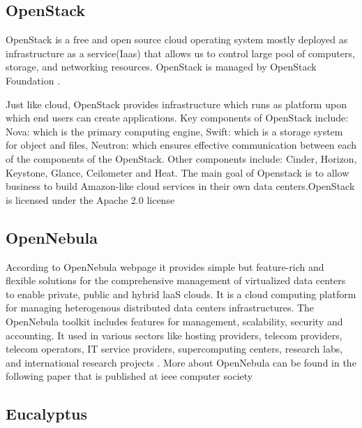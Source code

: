 \subsection{ OpenStack}
 
     OpenStack \cite{www-OpenStack.org} is a free and open source cloud operating 
     system mostly deployed as infrastructure as a service(Iaas) that allows 
     us to control large pool of computers, storage, and networking resources.
     OpenStack is managed by OpenStack Foundation \cite{www-OpenStack-Found}. 
     
     Just like cloud, OpenStack provides infrastructure which runs as platform 
     upon which end users can create applications. Key components of OpenStack 
     include: Nova: which is the primary computing engine, Swift: which is a 
     storage system for object and files, Neutron: which ensures effective 
     communication between each of the components of the OpenStack. Other   
     components include: Cinder, Horizon, Keystone, Glance, Ceilometer and 
     Heat. The main goal of Openstack is to allow business to build 
     Amazon-like cloud services in their own data centers.OpenStack is 
     licensed under the Apache 2.0 license \cite{www-apache-license} 
	
\subsection{ OpenNebula}

     According to OpenNebula webpage \cite{www-opennebula-org} it
     provides simple but feature-rich and flexible solutions for the
     comprehensive management of virtualized data centers to enable
     private, public and hybrid laaS clouds. It is a cloud computing
     platform for managing heterogenous distributed data centers
     infrastructures. The OpenNebula toolkit includes features for
     management, scalability, security and accounting. It used in
     various sectors like hosting providers, telecom providers,
     telecom operators, IT service providers, supercomputing centers,
     research labs, and international research projects
     \cite{www-opennebula-wiki}. More about OpenNebula can be found
     in the following paper that is published at ieee computer society
     \cite{paper-opennebula}
     
\subsection{ Eucalyptus}

